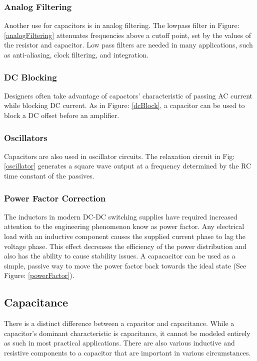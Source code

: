 \subsubsection{Analog Filtering}

Another use for capacitors is in analog filtering. The lowpass filter in Figure: \ref{analogFiltering} attenuates frequencies above a cutoff point, set by the values of the resistor and capacitor. Low pass filters are needed in many applications, such as anti-aliasing, clock filtering, and integration.


\subsubsection{DC Blocking}

Designers often take advantage of capactors' characteristic of passing AC current while blocking DC current. As in Figure: \ref{dcBlock}, a capacitor can be used to block a DC offset before an amplifier. 


\subsubsection{Oscillators}

Capacitors are also used in oscillator circuits. The relaxation circuit in Fig: \ref{oscillator} generates a square wave output at a frequency determined by the RC time constant of the passives.


\subsubsection{Power Factor Correction}


The inductors in modern DC-DC switching supplies have required increased attention to the engineering phenomenon know as power factor. Any electrical load with an inductive component causes the supplied current phase to lag the voltage phase. This effect decreases the efficiency of the power distribution and also has the ability to cause stability issues. A capacacitor can be used as a simple, passive way to move the power factor back towards the ideal state (See Figure: \ref{powerFactor}). \cite{cui_powerFactor}


\subsection{Capacitance}

There is a distinct difference between a capacitor and capacitance. While a capacitor's dominant characteristic is capacitance, it cannot be modeled entirely as such in most practical applications. There are also various inductive and resistive components to a capacitor that are important in various circumstances.

